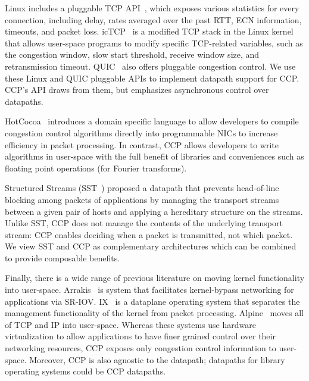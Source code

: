 Linux includes a pluggable TCP API~\cite{lwn-pluggable-tcp}, which exposes various statistics for every connection, including delay, rates averaged over the past RTT, ECN information, timeouts, and packet loss.
icTCP~\cite{icTCP} is a modified TCP stack in the Linux kernel that allows user-space programs to modify specific TCP-related variables, such as the congestion window, slow start threshold, receive window size, and retransmission timeout. 
QUIC~\cite{quic} also offers pluggable congestion control. 
We use these Linux and QUIC pluggable APIs to implement datapath support for CCP. CCP's API draws from them, but emphasizes asynchronous control over datapaths.

HotCocoa~\cite{hotcocoa} introduces a domain specific language to allow developers to compile congestion control algorithms directly into programmable NICs to increase efficiency in packet processing. In contrast, CCP allows developers to write algorithms in user-space with the full benefit of libraries and conveniences such as  floating point operations (\eg for Fourier transforms). 

Structured Streams (SST~\cite{structuredstreams}) proposed a datapath that prevents head-of-line blocking among packets of applications by managing the transport streams between a given pair of hosts and applying a hereditary structure on the streams. %
Unlike SST, CCP does not manage the contents of the underlying transport stream: CCP enables deciding when a packet is transmitted, not which packet.
%
We view SST and CCP as complementary architectures which can be combined to provide composable benefits.
%

Finally, there is a wide range of previous literature on moving kernel functionality into user-space. 
Arrakis~\cite{arrakis2014} is system that facilitates kernel-bypass networking for applications via SR-IOV. 
IX~\cite{ix} is a dataplane operating system that separates the management functionality of the kernel from packet processing. 
Alpine~\cite{alpine} moves all of TCP and IP into user-space.
Whereas these systems use hardware virtualization to allow applications to have finer grained control over their networking resources,
CCP exposes only congestion control information to user-space. 
Moreover, CCP is also agnostic to the datapath; datapaths for library operating systems could be CCP datapaths.